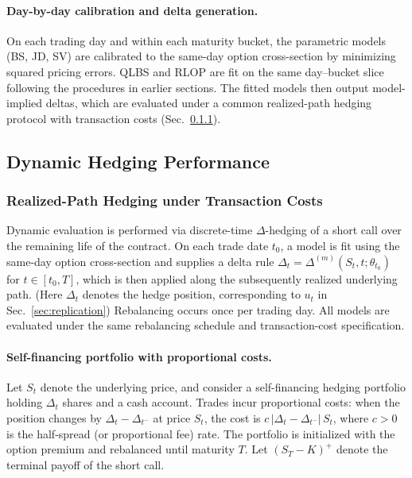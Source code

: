 \paragraph{Day-by-day calibration and delta generation.}
On each trading day and within each maturity bucket, the parametric models (BS, JD, SV) are calibrated to the same-day option cross-section by minimizing squared
pricing errors.
QLBS and RLOP are fit on the same day--bucket slice following the procedures in earlier sections.
The fitted models then output model-implied deltas, which are evaluated under a common realized-path hedging protocol with transaction costs (Sec.~\ref{subsubsec:realized_path_hedging}).


\subsection{Dynamic Hedging Performance}
\label{subsec:dynamic_hedging}

\subsubsection{Realized-Path Hedging under Transaction Costs}
\label{subsubsec:realized_path_hedging}

Dynamic evaluation is performed via discrete-time $\Delta$-hedging of a short call over the remaining life of the contract.
On each trade date $t_0$, a model is fit using the same-day option cross-section and supplies a delta rule
$\Delta_t=\Delta^{(m)}(S_t,t; \theta_{t_0})$ for $t\in[t_0,T]$, which is then applied along the subsequently realized underlying path.
(Here $\Delta_t$ denotes the hedge position, corresponding to $u_t$ in Sec.~\ref{sec:replication})
Rebalancing occurs once per trading day. All models are evaluated under the same rebalancing schedule and transaction-cost specification.

\paragraph{Self-financing portfolio with proportional costs.}
Let $S_t$ denote the underlying price, and consider a self-financing hedging portfolio holding $\Delta_t$ shares and a cash account.
Trades incur proportional costs: when the position changes by $\Delta_t-\Delta_{t^-}$ at price $S_t$, the cost is
$c\,|\Delta_t-\Delta_{t^-}|\,S_t$, where $c>0$ is the half-spread (or proportional fee) rate.
The portfolio is initialized with the option premium and rebalanced until maturity $T$.
Let $(S_T-K)^+$ denote the terminal payoff of the short call.


